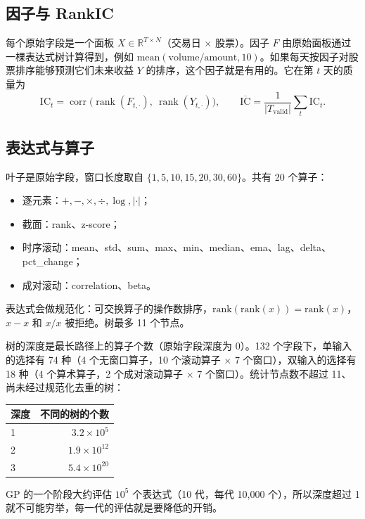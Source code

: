 \documentclass[11pt,a4paper,UTF8,fontset=fandol]{ctexart}
\begin{document}
\subsection{因子与 RankIC}
每个原始字段是一个面板 $X\in\mathbb{R}^{T\times N}$（交易日 $\times$ 股票）。因子 $F$ 由原始面板通过一棵表达式树计算得到，例如 $\mathrm{mean}(\text{volume}/\text{amount}, 10)$。如果每天按因子对股票排序能够预测它们未来收益 $Y$ 的排序，这个因子就是有用的。它在第 $t$ 天的质量为
\begin{equation}
  \mathrm{IC}_t = \operatorname{corr}\!\big(\operatorname{rank}(F_{t,\cdot}),\ \operatorname{rank}(Y_{t,\cdot})\big),
  \qquad \overline{\mathrm{IC}} = \frac{1}{|T_{\mathrm{valid}}|}\sum_{t} \mathrm{IC}_t .
\end{equation}

\subsection{表达式与算子}
叶子是原始字段，窗口长度取自 $\{1,5,10,15,20,30,60\}$。共有 20 个算子：
\begin{itemize}[nosep]
  \item 逐元素：$+,-,\times,\div,\log,|\cdot|$；
  \item 截面：rank、z-score；
  \item 时序滚动：mean、std、sum、max、min、median、ema、lag、delta、pct\_change；
  \item 成对滚动：correlation、beta。
\end{itemize}
表达式会做规范化：可交换算子的操作数排序，$\mathrm{rank}(\mathrm{rank}(x))=\mathrm{rank}(x)$，$x-x$ 和 $x/x$ 被拒绝。树最多 11 个节点。

\label{sec:space}
树的深度是最长路径上的算子个数（原始字段深度为 0）。132 个字段下，单输入的选择有 74 种（4 个无窗口算子，10 个滚动算子 $\times$ 7 个窗口），双输入的选择有 18 种（4 个算术算子，2 个成对滚动算子 $\times$ 7 个窗口）。统计节点数不超过 11、尚未经过规范化去重的树：

\begin{center}
\begin{tabular}{lr}
\toprule
深度 & 不同的树的个数 \\
\midrule
1 & $3.2\times10^{5}$ \\
2 & $1.9\times10^{12}$ \\
3 & $5.4\times10^{20}$ \\
\bottomrule
\end{tabular}
\end{center}
GP 的一个阶段大约评估 $10^5$ 个表达式（10 代，每代 10{,}000 个），所以深度超过 1 就不可能穷举，每一代的评估就是要降低的开销。
\end{document}
